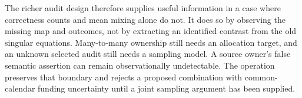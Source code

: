 The richer audit design therefore supplies useful information in a case where
correctness counts and mean mixing alone do not. It does so by observing the
missing map and outcomes, not by extracting an identified contrast from the
old singular equations. Many-to-many ownership still needs an allocation
target, and an unknown selected audit still needs a sampling model. A source
owner's false semantic assertion can remain observationally undetectable.
The operation preserves that boundary and rejects a proposed combination
with common-calendar funding uncertainty until a joint sampling argument
has been supplied.
